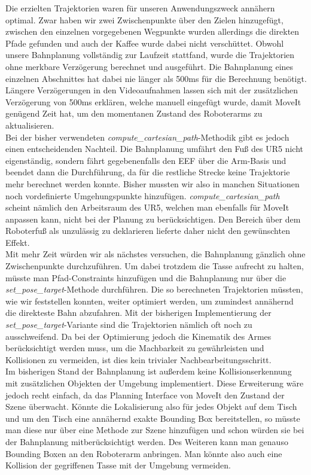 Die erzielten Trajektorien waren für unseren Anwendungszweck annähern optimal. Zwar haben wir zwei Zwischenpunkte über den Zielen hinzugefügt, zwischen den einzelnen vorgegebenen Wegpunkte wurden allerdings die direkten Pfade gefunden und auch der Kaffee wurde dabei nicht verschüttet.
\newline
Obwohl unsere Bahnplanung vollständig zur Laufzeit stattfand, wurde die Trajektorien ohne merkbare Verzögerung berechnet und ausgeführt. Die Bahnplanung eines einzelnen Abschnittes hat dabei nie länger als 500ms für die Berechnung benötigt. Längere Verzögerungen in den Videoaufnahmen lassen sich mit der zusätzlichen Verzögerung von 500ms erklären, welche manuell eingefügt wurde, damit MoveIt genügend Zeit hat, um den momentanen Zustand des Roboterarms zu aktualisieren.
\newline \\
Bei der bisher verwendeten \textit{compute\_cartesian\_path}-Methodik gibt es jedoch einen entscheidenden Nachteil. Die Bahnplanung umfährt den Fuß des UR5 nicht eigenständig, sondern fährt gegebenenfalls den EEF über die Arm-Basis und beendet dann die Durchführung, da für die restliche Strecke keine Trajektorie mehr berechnet werden konnte. Bisher mussten wir also in manchen Situationen noch vordefinierte Umgehungspunkte hinzufügen. \textit{compute\_cartesian\_path} scheint nämlich den Arbeitsraum des UR5, welchen man ebenfalls für MoveIt anpassen kann, nicht bei der Planung zu berücksichtigen. Den Bereich über dem Roboterfuß als unzulässig zu deklarieren lieferte daher nicht den gewünschten Effekt.
\newline \\
Mit mehr Zeit würden wir als nächstes versuchen, die Bahnplanung gänzlich ohne Zwischenpunkte durchzuführen. Um dabei trotzdem die Tasse aufrecht zu halten, müsste man Pfad-Constraints hinzufügen und die Bahnplanung nur über die \textit{set\_pose\_target}-Methode durchführen.
\newline
Die so berechneten Trajektorien müssten, wie wir feststellen konnten, weiter optimiert werden, um zumindest annähernd die direkteste Bahn abzufahren. Mit der bisherigen Implementierung der \textit{set\_pose\_target}-Variante sind die Trajektorien nämlich oft noch zu ausschweifend. Da bei der Optimierung jedoch die Kinematik des Armes berücksichtigt werden muss, um die Machbarkeit zu gewährleisten und Kollisionen zu vermeiden, ist dies kein trivialer Nachbearbeitungsschritt.
\newline \\
Im bisherigen Stand der Bahnplanung ist außerdem keine Kollisionserkennung mit zusätzlichen Objekten der Umgebung implementiert. Diese Erweiterung wäre jedoch recht einfach, da das Planning Interface von MoveIt den Zustand der Szene überwacht. Könnte die Lokalisierung also für jedes Objekt auf dem Tisch und um den Tisch eine annähernd exakte Bounding Box bereitstellen, so müsste man diese nur über eine Methode zur Szene hinzufügen und schon würden sie bei der Bahnplanung mitberücksichtigt werden. Des Weiteren kann man genauso Bounding Boxen an den Roboterarm anbringen. Man könnte also auch eine Kollision der gegriffenen Tasse mit der Umgebung vermeiden.